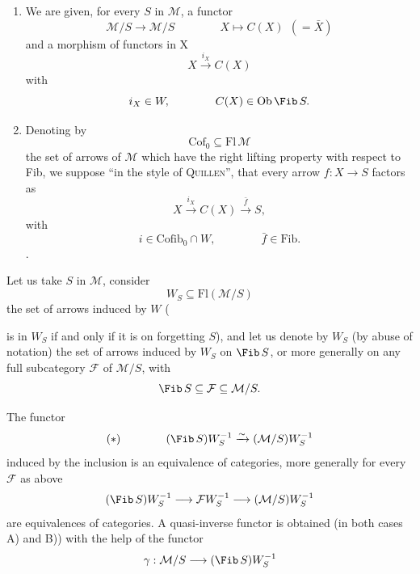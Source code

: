 
\begin{enumerate}[label={}]
\item[A)] We are given, for every $S$ in $\mathcal{M}$, a functor
\[
\mathcal{M}/S\longrightarrow\mathcal{M}/S\qquad\qquad X\longmapsto C(X)\ \ (=\bar X)
\]
and a morphism of functors in $\mathrm{X}$
\[
X\xrightarrow{i_X}C(X)
\]
with
\[
i_X\in W,\qquad\qquad C(X)\in\mathrm{Ob}\,\Fib\,S.
\]
\item[B)] Denoting by
\[
\mathrm{Cof}_0\subseteq\mathrm{Fl}\,\mathcal{M}
\]
the set of arrows of $\mathcal{M}$ which have the right lifting property with respect to Fib, we suppose ``in the style of \textsc{Quillen}'', that every arrow $f : X\longrightarrow S$ factors as
\[
X\xrightarrow{i_X}C(X)\xrightarrow{\bar f}S,
\]
with
\[
i\in\mathrm{Cofib}_0\cap W,\qquad\qquad\bar f\in\mathrm{Fib}.
\]
.
\end{enumerate}

Let us take $S$ in $\mathcal{M}$, consider
\[
W_S\subseteq\mathrm{Fl}(\mathcal{M}/S)
\]
the set of arrows induced by $W$ (
is in $W_S$ if and only if it is on forgetting $S$), and let us denote by $W_S$ (by abuse of notation) the set of arrows induced by $W_S$ on $\Fib\,S$, or more generally on any full subcategory $\mathcal{F}$ of $\mathcal{M}/S$, with
\[
\Fib\,S\subseteq\mathcal{F}\subseteq\mathcal{M}/S.
\]

 The functor
\[
(\ast)\qquad\qquad(\Fib\,S)W_S^{-1}\xrightarrow{\sim}(\mathcal{M}/S)W_S^{-1}
\]
induced by the inclusion is an equivalence of categories, more generally for every $\mathcal{F}$ as above
\[
(\Fib\,S)W_S^{-1}\longrightarrow\mathcal{F}W_S^{-1}\longrightarrow(\mathcal{M}/S)W_S^{-1}
\]
are equivalences of categories. A quasi-inverse functor is obtained (in both cases A) and B)) with the help of the functor
\[
\gamma : \mathcal{M}/S\longrightarrow(\Fib\,S)W_S^{-1}
\]

